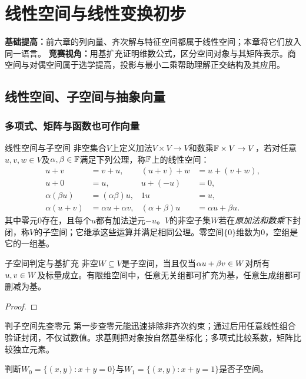 \chapter{线性空间与线性变换初步}\label{ch:spaces}
\begin{examtip}
\textbf{基础提高：}前六章的列向量、齐次解与特征空间都属于线性空间；本章将它们放入同一语言。
\textbf{竞赛视角：}用基扩充证明维数公式，区分空间对象与其矩阵表示。商空间与对偶空间属于选学提高，投影与最小二乘帮助理解正交结构及其应用。
\end{examtip}
\section{线性空间、子空间与抽象向量}
\subsection{多项式、矩阵与函数也可作向量}
\begin{definition}{线性空间与子空间}
非空集合$V$上定义加法$V\times V\to V$和数乘$\mathbb{F}\times V\to V$，若对任意$u,v,w\in V$及$\alpha,\beta\in\mathbb{F}$满足下列公理，称$\mathbb{F}$上的线性空间：
\[\begin{aligned}
u+v&=v+u,&(u+v)+w&=u+(v+w),\\
u+0&=u,&u+(-u)&=0,\\
\alpha(\beta u)&=(\alpha\beta)u,&1u&=u,\\
\alpha(u+v)&=\alpha u+\alpha v,&(\alpha+\beta)u&=\alpha u+\beta u.
\end{aligned}\]
其中零元$0$存在，且每个$u$都有加法逆元$-u$。$V$的非空子集$W$若在\emph{原加法和数乘}下封闭，称$V$的子空间；它继承这些运算并满足相同公理。零空间$\{0\}$维数为0，空组是它的一组基。
\end{definition}
\begin{theorem}{子空间判定与基扩充}
非空$W\subseteq V$是子空间，当且仅当$\alpha u+\beta v\in W$对所有$u,v\in W$及标量成立。有限维空间中，任意无关组都可扩充为基，任意生成组都可删减为基。
\end{theorem}
\begin{proof}

\end{proof}
\begin{method}{判子空间先查零元}
第一步查零元能迅速排除非齐次约束；通过后用任意线性组合验证封闭，不仅试数值。求基则把对象按自然基坐标化；多项式比较系数，矩阵比较独立元素。
\end{method}
{判断$W_0=\{(x,y):x+y=0\}$与$W_1=\{(x,y):x+y=1\}$是否子空间。}
